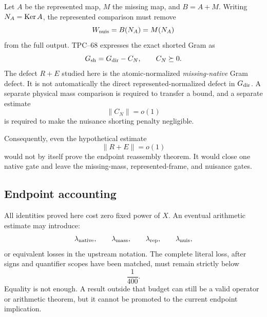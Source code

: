 Let \(A\) be the represented map, \(M\) the missing map, and \(B=A+M\).
Writing \(N_A=\operatorname{Ker} A\), the represented comparison must remove
\[
 W_{\rm nuis}=B(N_A)=M(N_A)
\]
from the full output.  TPC--68 expresses the exact shorted Gram as
\begin{equation}
 G_{\rm sh}=G_{\rm dir}-C_N,
 \qquad C_N\succeq0.
 \label{eq:shorted-penalty}
\end{equation}
The defect \(R+E\) studied here is the atomic-normalized
\emph{missing-native} Gram defect.  It is not automatically the direct
represented-normalized defect in \(G_{\rm dir}\).  A separate physical mass
comparison is required to transfer a bound, and a separate estimate
\[
 \|C_N\|=o(1)
\]
is required to make the nuisance shorting penalty negligible.

Consequently, even the hypothetical estimate
\[
 \|R+E\|=o(1)
\]
would not by itself prove the endpoint reassembly theorem.  It would close
one native gate and leave the missing-mass, represented-frame, and nuisance
gates.

\subsection{Endpoint accounting}

All identities proved here cost zero fixed power of \(X\).  An eventual
arithmetic estimate may introduce:
\[
 \lambda_{\rm native},\qquad
 \lambda_{\rm mass},\qquad
 \lambda_{\rm rep},\qquad
 \lambda_{\rm nuis},
\]
or equivalent losses in the upstream notation.  The complete literal loss,
after signs and quantifier scopes have been matched, must remain strictly
below
\[
 \frac1{400}.
\]
Equality is not enough.  A result outside that budget can still be a valid
operator or arithmetic theorem, but it cannot be promoted to the current
endpoint implication.
